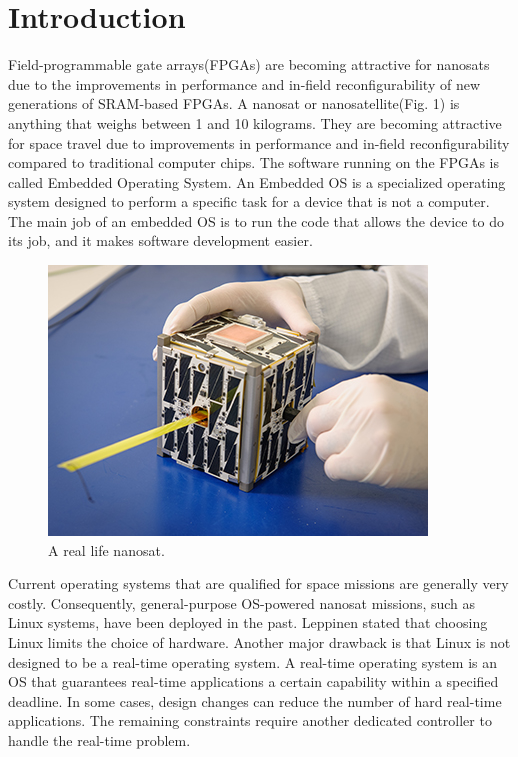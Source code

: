 \documentclass[conference]{IEEEtran}
\begin{document}
\section{Introduction}
Field-programmable gate arrays(FPGAs) are becoming attractive for nanosats due to the improvements in 
performance and in-field reconfigurability of new generations of SRAM-based FPGAs. A nanosat or nanosatellite(Fig. 1)
is anything that weighs between 1 and 10 kilograms. They are becoming attractive for space travel due to improvements 
in performance and in-field reconfigurability compared to traditional computer chips.
The software running on the FPGAs is called Embedded Operating System. An Embedded OS is a specialized operating system
designed to perform a specific task for a device that is not a computer. The main job of an embedded OS is to run the 
code that allows the device to do its job, and it makes software development easier. 
\begin{figure}[ht]
    \centering
    \includegraphics[scale = 2.5]{nanosat.jpg}
    \caption{A real life nanosat.}
\end{figure}
Current operating systems that are qualified for space missions are generally very costly. Consequently, general-purpose
OS-powered nanosat missions, such as Linux systems, have been deployed in the past. Leppinen \cite{b1} stated that choosing 
Linux limits the choice of hardware. Another major drawback is that Linux is not designed to be a real-time operating 
system. A real-time operating system is an OS that guarantees real-time applications a certain capability within a specified 
deadline. In some cases, design changes can reduce the number of hard real-time applications. The remaining constraints 
require another dedicated controller to handle the real-time problem. 

\end{document}
